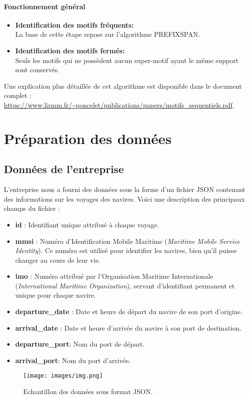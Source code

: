 \documentclass[a4paper,12pt]{article}
\begin{document}
\paragraph{Fonctionnement général}
\begin{itemize}
    \item \textbf{Identification des motifs fréquents:\\} La base de cette étape repose sur l'algorithme PREFIXSPAN.
    \item \textbf{Identification des motifs fermés:\\} Seuls les motifs qui ne possèdent aucun super-motif ayant le même support sont conservés.
\end{itemize}
\vspace{0.1cm}

Une explication plus détaillée de cet algorithme est disponible dans le document complet : \url{https://www.lirmm.fr/~poncelet/publications/papers/motifs_sequentiels.pdf}.

\newpage

\section{Préparation des données}
\subsection{Données de l'entreprise}

L’entreprise nous a fourni des données sous la forme d’un fichier JSON contenant des informations sur les voyages des navires. Voici une description des principaux champs du fichier :

\begin{itemize}
    \item \textbf{id} : Identifiant unique attribué à chaque voyage.
    \item \textbf{mmsi} : Numéro d’Identification Mobile Maritime (\textit{Maritime Mobile Service Identity}). Ce numéro est utilisé pour identifier les navires, bien qu’il puisse changer au cours de leur vie.
    \item \textbf{imo} : Numéro attribué par l’Organisation Maritime Internationale (\textit{International Maritime Organization}), servant d’identifiant permanent et unique pour chaque navire.
    \item \textbf{departure\_date} : Date et heure de départ du navire de son port d’origine.
    \item \textbf{arrival\_date} : Date et heure d’arrivée du navire à son port de destination.
    \item \textbf{departure\_port}: Nom du port de départ.
    \item \textbf{arrival\_port}: Nom du port d'arrivée.

\end{itemize}
\begin{figure}[h]
    \centering
    \texttt{[image: images/img.png]}
    \caption{Echantillon des données sous format JSON.}
    \label{fig:navire_data}
\end{figure}
\newpage
\end{document}
